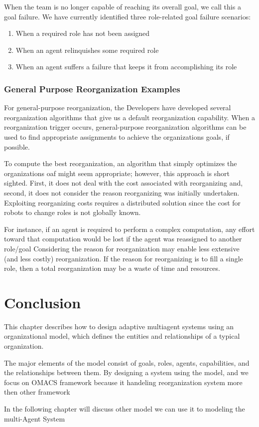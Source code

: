 When the team is no longer capable of reaching its overall goal, 
we call this a goal failure. We have currently identified three role-related goal failure
scenarios:\cite{omacs1}

\begin{enumerate}
	\item When a required role has not been assigned
	\item When an agent relinquishes some required role
	\item  When an agent suffers a failure that keeps it from accomplishing its role 
\end{enumerate}
  

\subsubsection{ General Purpose Reorganization Examples }

For general-purpose reorganization, the Developers have developed several reorganization algorithms that
give us a default reorganization capability. When a reorganization trigger occurs, general-purpose
reorganization algorithms can be used to find appropriate assignments to achieve the
organizations goals, if possible. \cite{omacs2}

To compute the best reorganization, an algorithm that simply
optimizes the organizations oaf might seem appropriate; however, this approach is short sighted.
First, it does not deal with the cost associated with reorganizing and, second, it does not consider
the reason reorganizing was initially undertaken. Exploiting reorganizing costs requires a
distributed solution since the cost for robots to change roles is not globally known. 

For instance, if an agent is required to perform a complex computation, any effort toward that computation
would be lost if the agent was reassigned to another role/goal Considering the reason for
reorganization may enable less extensive (and less costly) reorganization. If the reason for
reorganizing is to fill a single role, then a total reorganization may be a waste of time and
resources. \cite{omacs2}

\pagebreak

\section{Conclusion}

This chapter describes how to design adaptive multiagent
systems using an organizational model, which defines the
entities and relationships of a typical organization.

 The major elements of the model consist of goals, roles, agents,
capabilities, and the relationships between them. By
designing a system using the model, and we focus on OMACS framework
because it handeling reorganization system more then other framework

In the following chapter will discuss other model
we can use it to modeling the multi-Agent System
\textbf{}

